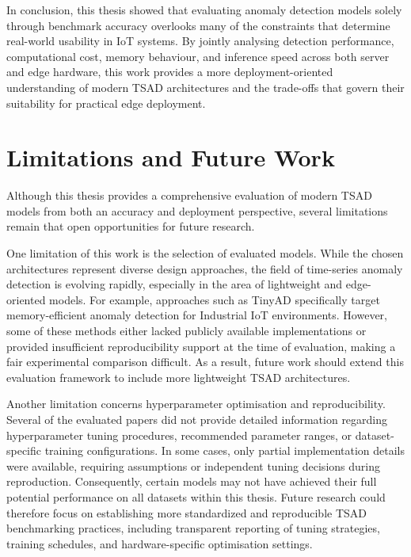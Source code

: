 \documentclass[twoside,11pt,openright]{report}
\begin{document}
In conclusion, this thesis showed that evaluating anomaly detection models solely
through benchmark accuracy overlooks many of the constraints that determine
real-world usability in IoT systems. By jointly analysing detection performance,
computational cost, memory behaviour, and inference speed across both server and
edge hardware, this work provides a more deployment-oriented understanding of
modern TSAD architectures and the trade-offs that govern their suitability for
practical edge deployment.


\section{Limitations and Future Work}

Although this thesis provides a comprehensive evaluation of modern TSAD models from 
both an accuracy and deployment perspective, several limitations remain that open 
opportunities for future research.

One limitation of this work is the selection of evaluated models. While the 
chosen architectures represent diverse design approaches, the field of time-series 
anomaly detection is evolving rapidly, especially in the area of lightweight and 
edge-oriented models. For example, approaches such as TinyAD \citep{tinyad2023} specifically 
target memory-efficient anomaly detection for Industrial IoT environments. 
However, some of these methods either lacked publicly available implementations or provided insufficient 
reproducibility support at the time of evaluation, making a fair experimental comparison difficult. 
As a result, future work should extend this evaluation framework to include more lightweight 
TSAD architectures.

Another limitation concerns hyperparameter optimisation and reproducibility. Several of 
the evaluated papers did not provide detailed information regarding hyperparameter tuning 
procedures, recommended parameter ranges, or dataset-specific training configurations. 
In some cases, only partial implementation details were available, requiring assumptions 
or independent tuning decisions during reproduction. Consequently, certain models may not have 
achieved their full potential performance on all datasets within this thesis. Future research could 
therefore focus on establishing more standardized and reproducible TSAD benchmarking practices, including 
transparent reporting of tuning strategies, training schedules, and hardware-specific optimisation settings.
\end{document}
